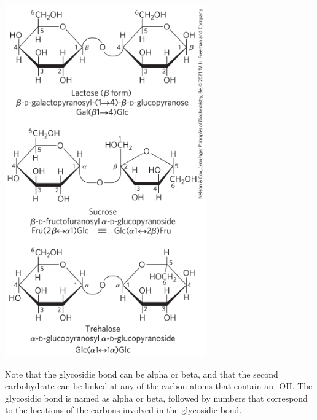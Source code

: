 \documentclass[10pt]{article}
\begin{document}
\begin{center}
    \includegraphics*[scale=0.6]{L1_14.png}
\end{center}
Note that the glycosidie bond can be alpha or beta, and that the second carbohydrate can be linked at any of the carbon atoms that contain an -OH.  The glycosidic bond is named as alpha or beta, followed by numbers that correspond to the locations of the carbons involved in the glycosidic bond.
\end{document}

